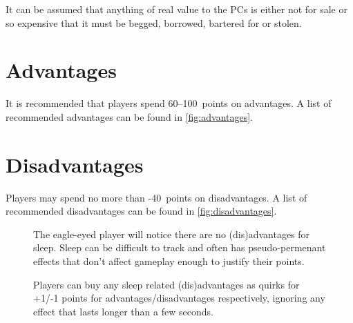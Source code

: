 It can be assumed that anything of real value to the PCs is either
not for sale or so expensive that it must be begged, borrowed, bartered for or
stolen.


\section{Advantages}
\label{sec:advantages}

It is recommended that players spend 60--100~points on advantages. A list of
recommended advantages can be found in \autoref{fig:advantages}.

\section{Disadvantages}
\label{sec:disadvantages}

Players may spend no more than -40~points on disadvantages. A list of
recommended disadvantages can be found in \autoref{fig:disadvantages}.




\begin{figure}[b]
  \centering
  \begin{tcolorbox}[title={Where are the sleep (dis)advantages?}]
    The eagle-eyed player will notice there are no (dis)advantages for sleep.
    Sleep can be difficult to track and often has pseudo-permenant effects that
    don't affect gameplay enough to justify their points.

    Players can buy any sleep related (dis)advantages as quirks for +1/-1 points for
    advantages/disadvantages respectively, ignoring any effect that lasts longer
    than a few seconds.
    
  \end{tcolorbox}
\end{figure}


